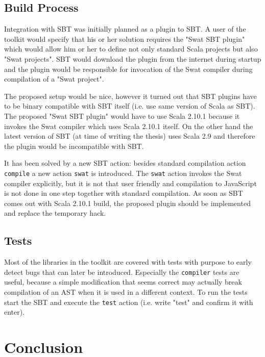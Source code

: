 \documentclass[12pt,a4paper]{report}
\begin{document}
\section{Build Process}

Integration with SBT was initially planned as a plugin to SBT. A user of the toolkit would specify that his or her solution requires the "Swat SBT plugin" which would allow him or her to define not only standard Scala projects but also "Swat projects". SBT would download the plugin from the internet during startup and the plugin would be responsible for invocation of the Swat compiler during compilation of a "Swat project". 

The proposed setup would be nice, however it turned out that SBT plugins have to be binary compatible with SBT itself (i.e. use same version of Scala as SBT). The proposed "Swat SBT plugin" would have to use Scala 2.10.1 because it invokes the Swat compiler which uses Scala 2.10.1 itself. On the other hand the latest version of SBT (at time of writing the thesis) uses Scala 2.9 and therefore the plugin would be incompatible with SBT.

It has been solved by a new SBT action: besides standard compilation action \texttt{compile} a new action \texttt{swat} is introduced. The \texttt{swat} action invokes the Swat compiler explicitly, but it is not that user friendly and compilation to JavaScript is not done in one step together with standard compilation. As soon as SBT comes out with Scala 2.10.1 build, the proposed plugin should be implemented and replace the temporary hack.

\section{Tests}

Most of the libraries in the toolkit are covered with tests with purpose to early detect bugs that can later be introduced. Especially the \texttt{compiler} tests are useful, because a simple modification that seems correct may actually break compilation of an AST when it is used in a different context. To run the tests start the SBT and execute the \texttt{test} action (i.e. write "test" and confirm it with enter).



\chapter{Conclusion}
\end{document}
